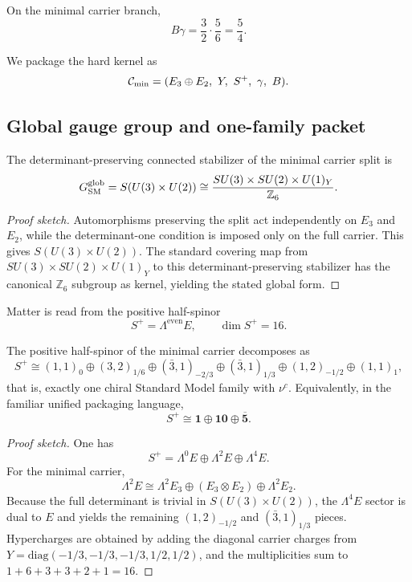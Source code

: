 \begin{corollary}
On the minimal carrier branch,
\[
B\gamma=\frac32\cdot\frac56=\frac54.
\]
\end{corollary}

We package the hard kernel as
\[
\Cmin=(E_3\oplus E_2,\ Y,\ S^+,\ \gamma,\ B).
\]

\subsection{Global gauge group and one-family packet}

\begin{theorem}
The determinant-preserving connected stabilizer of the minimal carrier split is
\[
G_{\mathrm{SM}}^{\mathrm{glob}}
=
S(U(3)\times U(2))
\cong
\frac{SU(3)\times SU(2)\times U(1)_Y}{\mathbb Z_6}.
\]
\end{theorem}

\begin{proof}[Proof sketch]
Automorphisms preserving the split act independently on $E_3$ and $E_2$, while the determinant-one condition is imposed only on the full carrier. This gives $S(U(3)\times U(2))$. The standard covering map from $SU(3)\times SU(2)\times U(1)_Y$ to this determinant-preserving stabilizer has the canonical $\mathbb Z_6$ subgroup as kernel, yielding the stated global form.
\end{proof}

Matter is read from the positive half-spinor
\[
S^+=\Lambda^{\mathrm{even}}E,
\qquad
\dim S^+=16.
\]

\begin{theorem}
The positive half-spinor of the minimal carrier decomposes as
\[
S^+
\cong
(1,1)_0\oplus(3,2)_{1/6}\oplus(\bar 3,1)_{-2/3}\oplus(\bar 3,1)_{1/3}\oplus(1,2)_{-1/2}\oplus(1,1)_1,
\]
that is, exactly one chiral Standard Model family with $\nu^c$. Equivalently, in the familiar unified packaging language,
\[
S^+\cong \mathbf 1\oplus \mathbf{10}\oplus \overline{\mathbf 5}.
\]
\end{theorem}

\begin{proof}[Proof sketch]
One has
\[
S^+=\Lambda^0E\oplus\Lambda^2E\oplus\Lambda^4E.
\]
For the minimal carrier,
\[
\Lambda^2E
\cong
\Lambda^2E_3\oplus(E_3\otimes E_2)\oplus\Lambda^2E_2.
\]
Because the full determinant is trivial in $S(U(3)\times U(2))$, the $\Lambda^4E$ sector is dual to $E$ and yields the remaining $(1,2)_{-1/2}$ and $(\bar 3,1)_{1/3}$ pieces. Hypercharges are obtained by adding the diagonal carrier charges from $Y=\mathrm{diag}(-1/3,-1/3,-1/3,1/2,1/2)$, and the multiplicities sum to $1+6+3+3+2+1=16$.
\end{proof}

